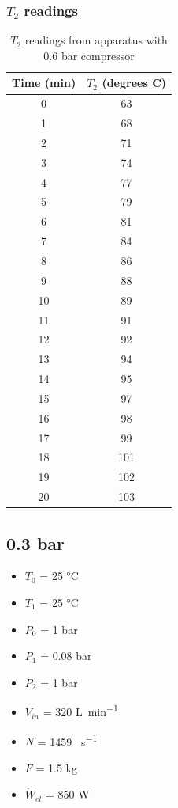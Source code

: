 \documentclass[class=article, crop=false, 12pt,a4paper]{standalone}
\numberwithin{equation}{section}
\begin{document}
\subsubsection{\(T_2\) readings}
\begin{table}
  \centering
    \begin{tabular}{|c|c|}
      \hline
      Time (\si{\minute}) & \(T_2\) (degrees C)\\
      \hline  
      0 & 63\\
      1 & 68\\
      2 & 71\\
      3 & 74\\
      4 & 77\\
      5 & 79\\
      6 & 81\\
      7 & 84\\
      8 & 86\\
      9 & 88\\
      10 & 89\\
      11 & 91\\
      12 & 92\\
      13 & 94\\
      14 & 95\\
      15 & 97\\
      16 & 98\\
      17 & 99\\
      18 & 101\\
      19 & 102\\
      20 & 103\\
      \hline
    \end{tabular}
  \caption{\(T_2\) readings from apparatus with 0.6 bar compressor}
  \label{table:2}
\end{table}
\subsection{0.3 bar}
\begin{multicols}{2}
  \begin{itemize}[noitemsep]
    \item \(T_0\) = 25 \si{\celsius}
    \item \(T_1\) = 25 \si{\celsius}
    \item \(P_0\) = 1 \si{\bar}
    \item \(P_1\) = 0.08 \si{\bar}
    \item \(P_2\) = 1 \si{\bar}
    \item \(V_{in}\) = 320 \si{\liter\per\minute}
    \item \(N\) = 1459 \si{\rev\per\second}
    \item \(F\) = 1.5 \si{\kilogram}
    \item \(\dot{W}_{el}\) = 850 \si{\watt}
  \end{itemize}
\end{multicols}
\end{document}
